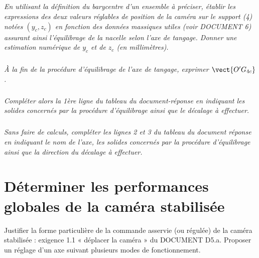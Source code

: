\documentclass[10pt,fleqn]{article} %
\begin{document}
\subparagraph{\label{q20a}}\textit{En utilisant la définition du barycentre d’un ensemble à préciser, établir les expressions des deux valeurs réglables de position de la caméra sur le support (4) notées $\left(y_c,z_c\right)$ en fonction des données massiques utiles (voir DOCUMENT 6) assurant ainsi l'équilibrage de la nacelle selon l'axe de tangage. Donner une estimation numérique de $y_c$ et de $z_c$ (en millimètres).}

\subparagraph{\label{q20b}}\textit{À la fin de la procédure d’équilibrage de l’axe de tangage, exprimer $\vect{O'G_{4c}}$.}

\subparagraph{\label{q20c}}\textit{Compléter alors la 1ère ligne du tableau du document-réponse en indiquant les solides concernés par la procédure d’équilibrage ainsi que le décalage à effectuer.}%

\subparagraph{\label{q20d}}\textit{Sans faire de calculs, compléter les lignes 2 et 3 du tableau du document réponse en indiquant le nom de l’axe, les solides concernés par la procédure d’équilibrage ainsi que la direction du décalage à effectuer.}%

\section{Déterminer les performances globales de la caméra stabilisée}
\begin{obj}
Justifier la forme particulière de la commande asservie (ou régulée) de la caméra stabilisée : exigence 1.1 « déplacer la caméra » du DOCUMENT D5.a. Proposer un réglage d’un axe suivant plusieurs modes de fonctionnement.
\end{obj}
\end{document}
